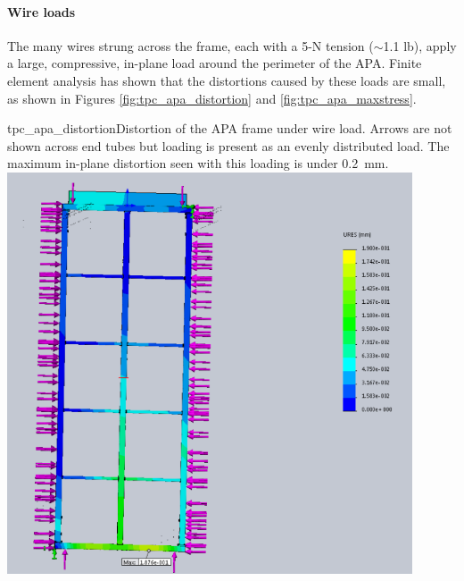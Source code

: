\paragraph{Wire loads}

The many wires strung across the frame, each with a 5-N tension ($\sim$1.1 lb), apply a large, compressive, in-plane load around the perimeter of the APA.  Finite element analysis has shown that the distortions caused by these loads are small, as shown in Figures \ref{fig:tpc_apa_distortion} and \ref{fig:tpc_apa_maxstress}.

\begin{cdrfigure}{tpc_apa_distortion}{Distortion of the APA frame under wire load.  Arrows are not shown across end tubes but loading is present as an evenly distributed load.  The maximum in-plane distortion seen with this loading is under 0.2~mm.}
\includegraphics[width=0.9\textwidth]{figures/tpc_apa_distortion.png} 
\end{cdrfigure}


